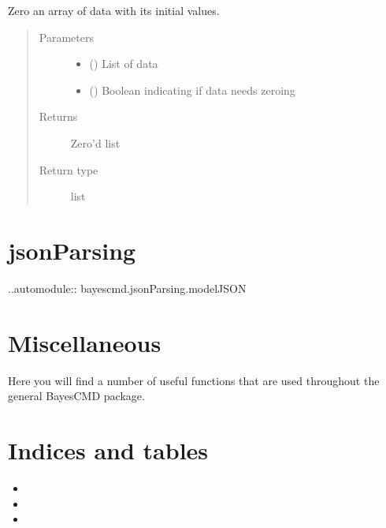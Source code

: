 \documentclass[letterpaper,10pt,english]{sphinxmanual}
\begin{document}
\begin{fulllineitems}
\label{\detokenize{abc:bayescmd.abc.distances.zero_array}}
Zero an array of data with its initial values.
\begin{quote}\begin{description}
\item[{Parameters}] \leavevmode\begin{itemize}
\item {} 
 () \textendash{} List of data

\item {} 
 () \textendash{} Boolean indicating if data needs zeroing

\end{itemize}

\item[{Returns}] \leavevmode
{} \textendash{} Zero’d list

\item[{Return type}] \leavevmode
list

\end{description}\end{quote}

\end{fulllineitems}



\chapter{jsonParsing}
\label{\detokenize{jsonParsing:jsonparsing}}\label{\detokenize{jsonParsing::doc}}
..automodule:: bayescmd.jsonParsing.modelJSON


\chapter{Miscellaneous}
\label{\detokenize{misc:miscellaneous}}\label{\detokenize{misc::doc}}
Here you will find a number of useful functions that are used throughout
the general BayesCMD package.


\chapter{Indices and tables}
\label{\detokenize{index:indices-and-tables}}\begin{itemize}
\item {} 

\item {} 

\item {} 

\end{itemize}
\end{document}
